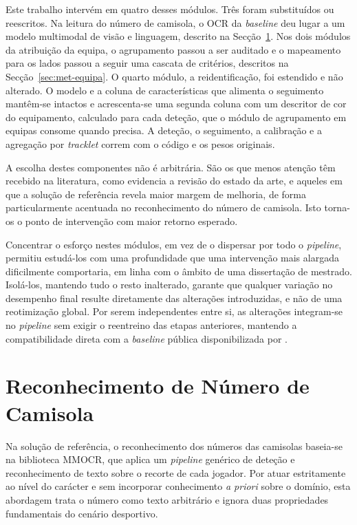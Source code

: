 Este trabalho intervém em quatro desses módulos. Três foram substituídos ou reescritos. Na
leitura do número de camisola, o OCR da \emph{baseline} deu lugar a um modelo multimodal de
visão e linguagem, descrito na Secção~\ref{sec:met-jnr}. Nos dois módulos da atribuição da equipa, o
agrupamento passou a ser auditado e o mapeamento para os lados passou a seguir uma cascata de
critérios, descritos na Secção~\ref{sec:met-equipa}. O quarto módulo, a reidentificação, foi
estendido e não alterado. O modelo e a coluna de características que alimenta o seguimento
mantêm-se intactos e acrescenta-se uma segunda coluna com um descritor de cor do equipamento,
calculado para cada deteção, que o módulo de agrupamento em equipas consome quando precisa. A deteção, o
seguimento, a calibração e a agregação por \emph{tracklet} correm com o código e os pesos
originais.

A escolha destes componentes não é arbitrária. São os que menos atenção têm recebido na
literatura, como evidencia a revisão do estado da arte, e aqueles em que a solução de referência
revela maior margem de melhoria, de forma particularmente acentuada no reconhecimento do número de
camisola. Isto torna-os o ponto de intervenção com maior retorno esperado.

Concentrar o esforço nestes módulos, em vez de o dispersar por todo o \emph{pipeline}, permitiu
estudá-los com uma profundidade que uma intervenção mais alargada dificilmente comportaria, em
linha com o âmbito de uma dissertação de mestrado. Isolá-los, mantendo tudo o resto inalterado,
garante que qualquer variação no desempenho final resulte diretamente das alterações introduzidas,
e não de uma reotimização global. Por serem independentes entre si, as alterações integram-se no
\emph{pipeline} sem exigir o reentreino das etapas anteriores, mantendo a compatibilidade direta
com a \emph{baseline} pública disponibilizada por \citet{somers2024soccernet}.

\section{Reconhecimento de Número de Camisola}\label{sec:met-jnr}

Na solução de referência, o reconhecimento dos números das camisolas baseia-se na biblioteca
MMOCR, que aplica um \emph{pipeline} genérico de deteção e reconhecimento de texto sobre o recorte de
cada jogador. Por atuar estritamente ao nível do carácter e sem incorporar conhecimento
\emph{a priori} sobre o domínio, esta abordagem trata o número como texto arbitrário e ignora
duas propriedades fundamentais do cenário desportivo.

